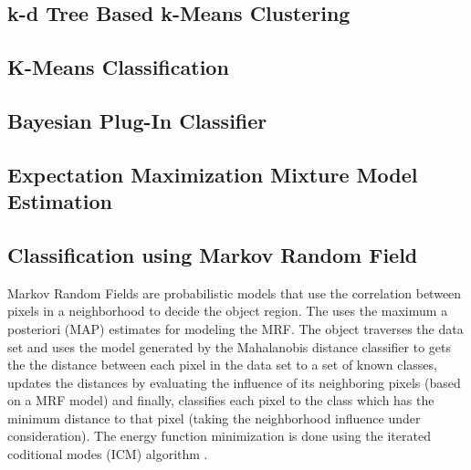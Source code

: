 \subsection{k-d Tree Based k-Means Clustering}
\label{sec:KdTreeBasedKMeansClustering}
\ifitkFullVersion

\fi

\subsection{K-Means Classification}
\label{sec:KMeansClassifier}
\ifitkFullVersion

\fi

\subsection{Bayesian Plug-In Classifier}
\label{sec:BayesianPluginClassifier}

\ifitkFullVersion 

\fi


\subsection{Expectation Maximization Mixture Model Estimation}
\label{sec:ExpectationMaximizationMixtureModelEstimation}

\ifitkFullVersion 

\fi

\subsection{Classification using Markov Random Field}
\label{sec:MarkovRandomField}

Markov Random Fields are probabilistic models that use the correlation between
pixels in a neighborhood to decide the object region. The
 uses the maximum a posteriori (MAP)
estimates for modeling the MRF. The object traverses the data set and uses the
model generated by the Mahalanobis distance classifier to gets the the distance
between each pixel in the data set to a set of known classes, updates the
distances by evaluating the influence of its neighboring pixels (based on a MRF
model) and finally, classifies each pixel to the class which has the minimum
distance to that pixel (taking the neighborhood influence under consideration).
The energy function minimization is done using the iterated coditional modes
(ICM) algorithm \cite{Besag1986}.

\ifitkFullVersion

\fi 



